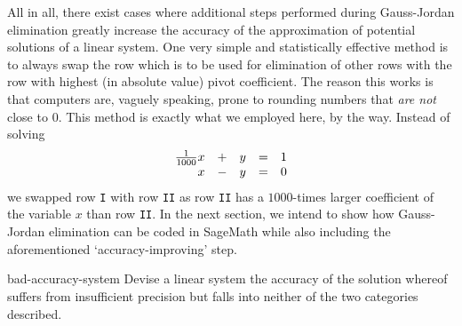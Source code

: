 All in all, there exist cases where additional steps performed during
Gauss-Jordan elimination greatly increase the accuracy of the approximation of
potential solutions of a linear system. One very simple and statistically
effective method is to always swap the row which is to be used for elimination
of other rows with the row with highest (in absolute value) pivot coefficient.
The reason this works is that computers are, vaguely speaking, prone to rounding
numbers that \emph{are not} close to $0$. This method is exactly what we
employed here, by the way. Instead of solving
\[
 \begin{array}{r c r c r}
  \frac{1}{1000}x & + & y & = & 1\\
  x & - & y & = & 0
 \end{array}
\]
we swapped row \texttt{I} with row \texttt{II} as row \texttt{II} has a
$1000$-times larger coefficient of the variable $x$ than row \texttt{II}. In the
next section, we intend to show how Gauss-Jordan elimination can be coded in
SageMath while also including the aforementioned `accuracy-improving' step.

\begin{exercise}{}{bad-accuracy-system}
 Devise a linear system the accuracy of the solution whereof suffers from
 insufficient precision but falls into neither of the two categories described.
\end{exercise}
